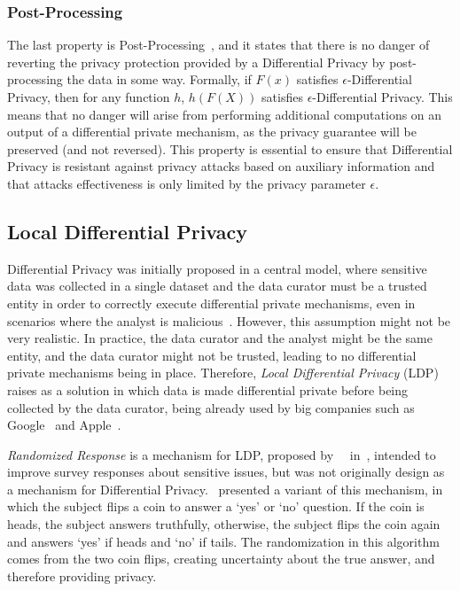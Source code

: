 \subsubsection{Post-Processing}\label{subsubsec:post_processing}

The last property is Post-Processing~\cite{DP_Book, AlgFoundationsDP}, and it states that there is no danger of reverting the privacy protection provided by a Differential Privacy by post-processing the data in some way. Formally, if \(F(x)\) satisfies \(\epsilon\)-Differential Privacy, then for any function \(h\), \(h(F(X))\) satisfies \(\epsilon\)-Differential Privacy. This means that no danger will arise from performing additional computations on an output of a differential private mechanism, as the privacy guarantee will be preserved (and not reversed). This property is essential to ensure that Differential Privacy is resistant against privacy attacks based on auxiliary information and that attacks effectiveness is only limited by the privacy parameter \(\epsilon\).

\subsection{Local Differential Privacy}\label{subsec:local_differential_privacy}

Differential Privacy was initially proposed in a central model, where sensitive data was collected in a single dataset and the data curator must be a trusted entity in order to correctly execute differential private mechanisms, even in scenarios where the analyst is malicious~\cite{DP_Book}. However, this assumption might not be very realistic. In practice, the data curator and the analyst might be the same entity, and the data curator might not be trusted, leading to no differential private mechanisms being in place. Therefore, \textit{Local Differential Privacy} (LDP) raises as a solution in which data is made differential private before being collected by the data curator, being already used by big companies such as Google~\cite{RAPPOR} and Apple~\cite{AppleDP}. 

\textit{Randomized Response} is a mechanism for LDP, proposed by~\citeauthor{RandomizedResponse}~\cite{RandomizedResponse} in~\citeyear{RandomizedResponse}, intended to improve survey responses about sensitive issues, but was not originally design as a mechanism for Differential Privacy.~\citeauthor{AlgFoundationsDP} presented a variant of this mechanism, in which the subject flips a coin to answer a `yes' or `no' question. If the coin is heads, the subject answers truthfully, otherwise, the subject flips the coin again and answers `yes' if heads and `no' if tails. The randomization in this algorithm comes from the two coin flips, creating uncertainty about the true answer, and therefore providing privacy.


